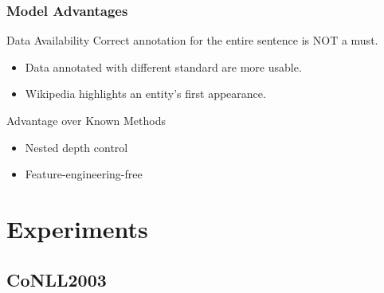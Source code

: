 \documentclass{beamer}
\begin{document}
\begin{frame}
\frametitle{Model Advantages}
\begin{block}{Data Availability}
	Correct annotation for the entire sentence is NOT a must.
	\begin{itemize}
		\item Data annotated with different standard are more usable.
		\item Wikipedia highlights an entity's first appearance.{\scriptsize\parencite{nothman2013learning}}
	\end{itemize}
\end{block}
\begin{alertblock}{Advantage over Known Methods}
	\begin{itemize}
		\item Nested depth control
		\item Feature-engineering-free
	\end{itemize}
\end{alertblock}
\end{frame}



\section{Experiments} 


\subsection{CoNLL2003}
\end{document}
